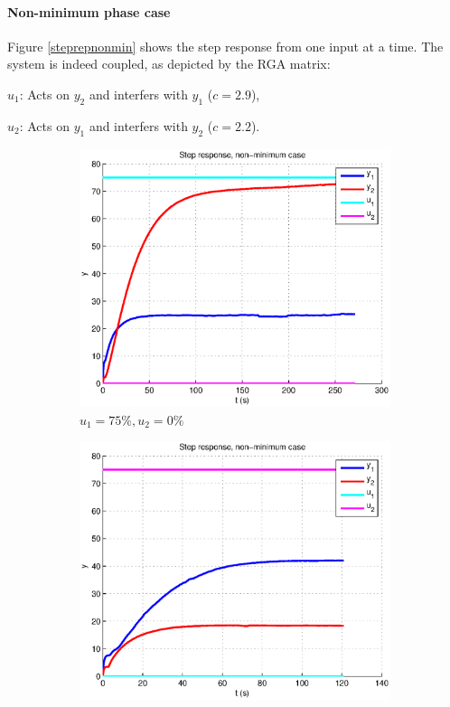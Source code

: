 \paragraph{Non-minimum phase case} 

Figure \ref{steprepnonmin} shows the step response from one input at a time.
The system is indeed coupled, as depicted by the RGA matrix:
\begin{shortitemize}
    \item $u_1$: Acts on $y_2$ and interfers with $y_1$ ($c=2.9$),
    \item $u_2$: Acts on $y_1$ and interfers with $y_2$ ($c=2.2$).
\end{shortitemize}

\begin{figure}[h!t]
        \centering
        \begin{subfigure}[b]{0.45\columnwidth}
                \includegraphics[width=\columnwidth]{fig/steprepnonmin0_75.eps}
                \caption{$u_1 = 75\%, u_2 = 0\%$}
        \end{subfigure}
        \begin{subfigure}[b]{0.45\columnwidth}
                \includegraphics[width=\columnwidth]{fig/steprepnonmin75_0.eps}

\end{subfigure}
\end{figure}
